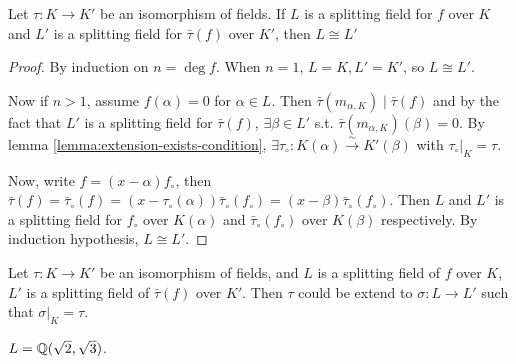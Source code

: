 \begin{theorem} \label{thm:two-splitting-field-are-isom}
  Let $\tau: K \to K'$ be an isomorphism of fields.
  If $L$ is a splitting field for $f$ over $K$ and $L'$ is a splitting field for $\bar\tau(f)$
  over $K'$, then $L \cong L'$

\begin{proof} \label{coro:extension-exists-splitting-field}
  By induction on $n = \deg f$. When $n = 1$, $L = K, L' = K'$, so $L \cong L'$.

  Now if $n > 1$, assume $f(\alpha) = 0$ for $\alpha \in L$. Then
  $\bar\tau(m_{\alpha, K}) \mid \bar\tau(f)$ and by the fact that $L'$ is a
  splitting field for $\bar\tau(f)$, $\exists \beta \in L'$ s.t. $\bar\tau(m_{\alpha, K})(\beta) = 0$.
  By lemma \ref{lemma:extension-exists-condition}, $\exists \tau_{\circ}:
  K(\alpha) \xrightarrow\sim K'(\beta)$ with $\tau_\circ \big|_K = \tau$.

  Now, write $f = (x - \alpha) f_\circ$, then $\bar\tau(f) = \bar\tau_\circ(f) = (x - \tau_\circ(\alpha))
  \bar\tau_\circ(f_\circ) = (x - \beta) \bar\tau_\circ(f_\circ)$. Then $L$ and $L'$ is a splitting
  field for $f_{\circ}$ over $K(\alpha)$ and $\bar\tau_\circ(f_\circ)$ over $K(\beta)$ respectively.
  By induction hypothesis, $L \cong L'$.
\end{proof}
\end{theorem}

\begin{coro}
  Let $\tau: K \to K'$ be an isomorphism of fields, and
  $L$ is a splitting field of $f$ over $K$, $L'$ is a splitting field of $\bar\tau(f)$ over $K'$.
  Then $\tau$ could be extend to $\sigma: L \to L'$ such that $\sigma\big|_K = \tau$.
\end{coro}

\begin{example}
  $L = \mathbb{Q}(\sqrt{2}, \sqrt{3})$.
\end{example}
